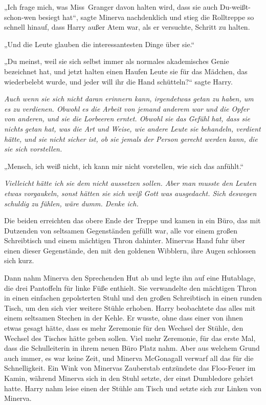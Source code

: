 {„Ich frage mich, was Miss~Granger davon halten wird, dass sie auch Du-weißt-schon-wen besiegt hat“, sagte Minerva nachdenklich und stieg die Rolltreppe so schnell hinauf, dass Harry außer Atem war, als er versuchte, Schritt zu halten.

„Und die Leute glauben die interessantesten Dinge über sie.“

„Du meinst, weil sie sich selbst immer als normales akademisches Genie bezeichnet hat, und jetzt halten einen Haufen Leute sie für das Mädchen, das wiederbelebt wurde, und jeder will ihr die Hand schütteln?“ sagte Harry.

\emph{Auch wenn sie sich nicht daran erinnern kann, irgendetwas getan zu haben, um es zu verdienen. Obwohl es die Arbeit von jemand anderem war und die Opfer von anderen, und sie die Lorbeeren erntet. Obwohl sie das Gefühl hat, dass sie nichts} \emph{getan hat, was die Art und Weise, wie andere Leute sie behandeln, verdient hätte, und sie nicht sicher ist, ob sie jemals der Person gerecht werden kann, die sie sich vorstellen.}

„Mensch, ich weiß nicht, ich kann mir nicht vorstellen, wie sich das anfühlt.“

\emph{Vielleicht hätte ich sie dem nicht aussetzen sollen. Aber man musste den Leuten etwas vorgaukeln, sonst hätten sie sich weiß Gott was ausgedacht. Sich deswegen schuldig zu fühlen, wäre dumm. Denke ich.}

Die beiden erreichten das obere Ende der Treppe und kamen in ein Büro, das mit Dutzenden von seltsamen Gegenständen gefüllt war, alle vor einem großen Schreibtisch und einem mächtigen Thron dahinter. Minervas Hand fuhr über einen dieser Gegenstände, den mit den goldenen Wibblern, ihre Augen schlossen sich kurz.

Dann nahm Minerva den Sprechenden Hut ab und legte ihn auf eine Hutablage, die drei Pantoffeln für linke Füße enthielt. Sie verwandelte den mächtigen Thron in einen einfachen gepolsterten Stuhl und den großen Schreibtisch in einen runden Tisch, um den sich vier weitere Stühle erhoben. Harry beobachtete das alles mit einem seltsamen Stechen in der Kehle. Er wusste, ohne dass einer von ihnen etwas gesagt hätte, dass es mehr Zeremonie für den Wechsel der Stühle, den Wechsel des Tisches hätte geben sollen. Viel mehr Zeremonie, für das erste Mal, dass die Schulleiterin in ihrem neuen Büro Platz nahm. Aber aus welchem Grund auch immer, es war keine Zeit, und Minerva McGonagall verwarf all das für die Schnelligkeit. Ein Wink von Minervas Zauberstab entzündete das Floo-Feuer im Kamin, während Minerva sich in den Stuhl setzte, der einst Dumbledore gehört hatte. Harry nahm leise einen der Stühle am Tisch und setzte sich zur Linken von Minerva.

}
